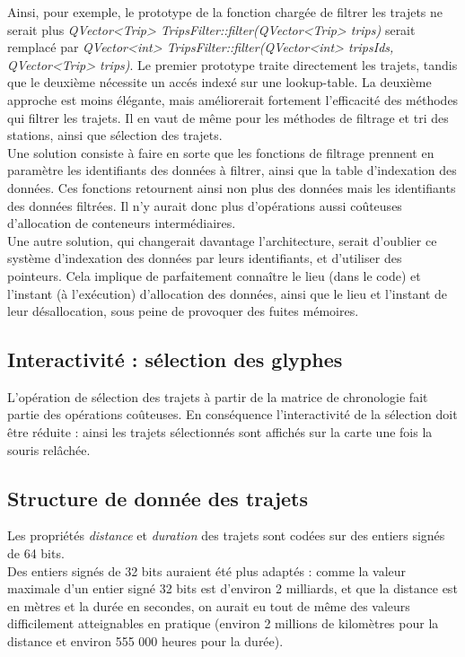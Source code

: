 \documentclass[12pt]{article}
\begin{document}
		Ainsi, pour exemple, le prototype de la fonction chargée de filtrer les trajets ne serait plus
\textit{QVector<Trip> TripsFilter::filter(QVector<Trip> trips)} serait remplacé par 
\textit{QVector<int> TripsFilter::filter(QVector<int> tripsIds, QVector<Trip> trips)}. Le premier prototype traite directement les trajets, tandis que le deuxième nécessite un accés indexé sur une lookup-table. La deuxième approche est moins élégante, mais améliorerait fortement l’efficacité des méthodes qui filtrer les trajets. Il en vaut de même pour les méthodes de filtrage et tri des stations, ainsi que sélection des trajets.\\
	
		Une solution consiste à faire en sorte que les fonctions de filtrage prennent en paramètre les identifiants des données à filtrer, ainsi que la table d’indexation des données. Ces fonctions retournent ainsi non plus des données mais les identifiants des données filtrées. Il n’y aurait donc plus d’opérations aussi coûteuses d’allocation de conteneurs intermédiaires.\\
	
		Une autre solution, qui changerait davantage l’architecture, serait d’oublier ce système d’indexation des données par leurs identifiants, et d’utiliser des pointeurs. Cela implique de parfaitement connaître le lieu (dans le code) et l’instant (à l'exécution) d’allocation des données, ainsi que le lieu et l’instant de leur désallocation, sous peine de provoquer des fuites mémoires.
	
		\subsection{Interactivité : sélection des glyphes}
		L'opération de sélection des trajets à partir de la matrice de chronologie fait partie des opérations coûteuses.
		En conséquence l’interactivité de la sélection doit être réduite : ainsi les trajets sélectionnés sont affichés
		sur la carte une fois la souris relâchée. 
		
		\subsection{Structure de donnée des trajets}
		Les propriétés \textit{distance} et \textit{duration} des trajets sont codées sur des entiers signés de 64 bits.\\

		Des entiers signés de 32 bits auraient été plus adaptés : comme la valeur maximale d’un entier signé 32 bits est d’environ 2 milliards, et que la distance est en mètres et la durée en secondes, on aurait eu tout de même des valeurs difficilement atteignables en pratique (environ 2 millions de kilomètres pour la distance et environ 555 000 heures pour la durée). \\
\end{document}
